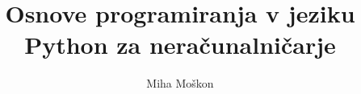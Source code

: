 \documentclass[
a4paper, %
12pt, %
onecolumn, %
openright, %
]{memoir}
\author{Miha Moškon}
\title{Osnove programiranja v jeziku Python za neračunalničarje}
\newif\iffrontFRI
\begin{document}




\frontmatter
\iffrontFRI
\maketitle

Naslovno stran (stran i) in stran z ISBN in CIP informacijo (stran ii) bo založba nadomestila z novo postavljeno stranjo!

\clearpage

ISBN stran

\clearpage
\else



\clearpage
\ 
\clearpage


\fi


\tableofcontents*

\clearpage


\mainmatter




%





















%



%
%
\end{document}
